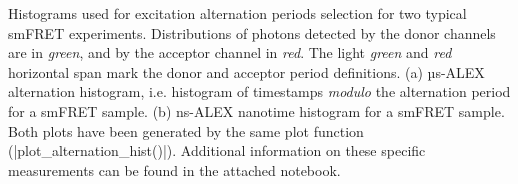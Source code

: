 \label{fig:altern_hist_double}
Histograms used for excitation alternation periods selection for two typical smFRET experiments. 
Distributions of photons detected by the donor channels are in \textit{green}, and by the acceptor channel in \textit{red}.
The light \textit{green} and \textit{red} horizontal span mark the donor and acceptor period definitions.
(a) µs-ALEX alternation histogram, i.e. histogram of timestamps \textit{modulo} the alternation period for a smFRET sample. 
(b) ns-ALEX nanotime histogram for a smFRET sample. Both plots have been generated by the same plot function (\textt|plot\_alternation\_hist()|). 
Additional information on these specific measurements can be found in the  attached notebook.